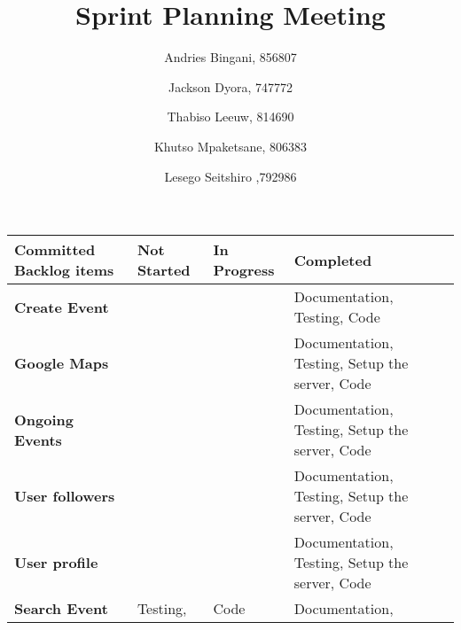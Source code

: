 \documentclass[10pt,a4paper]{article}
\title{Sprint Planning Meeting}
\author{
  Andries Bingani, 856807 \and
  Jackson Dyora, 747772\and
  Thabiso Leeuw, 814690 \and
  Khutso Mpaketsane, 806383 \and
  Lesego Seitshiro ,792986
}
\begin{document}
\maketitle



\begin{center}
\begin{tabular}{ || m{4cm} | m{4cm}| m{4cm} |m{3.5cm} || } 
\hline
\hline
\textbf{Committed Backlog items} & \textbf{Not Started} & \textbf{In Progress} & \textbf{Completed} \\ 
\hline
\hline
\textbf{Create Event} &  &  & Documentation, Testing, Code\\ 
\hline
\textbf{Google Maps} &  &  & Documentation, Testing, Setup the server, Code\\ 
\hline
\textbf{Ongoing Events} & &  & Documentation, Testing, Setup the server, Code  \\ 
\hline
\textbf{User followers} & &  &  Documentation, Testing, Setup the server, Code  \\ 
\hline
\textbf{User profile} & &  &  Documentation, Testing, Setup the server, Code  \\ 
\hline
\textbf{Search Event} &Testing, &Code  &  Documentation,   \\ 
\hline
\hline
\end{tabular}
\end{center}
\end{document}
